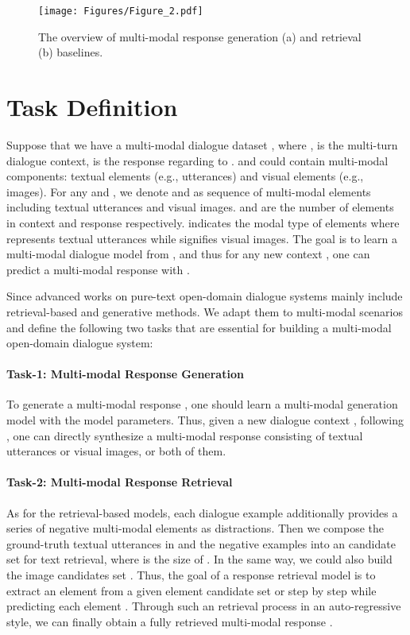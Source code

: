 \documentclass[11pt]{article}
\begin{document}
%
 \begin{figure*}[bht]
\centering
     \texttt{[image: Figures/Figure\_2.pdf]}
     \caption{The overview of multi-modal response generation (a) and retrieval (b) baselines.}
     \label{fig:model}
     \vspace{-5mm}
\end{figure*}



\section{Task Definition}
Suppose that we have a multi-modal dialogue dataset , where ,  is the multi-turn dialogue context,  is the response regarding to .  and  could contain multi-modal components: textual elements (e.g., utterances) and visual elements (e.g., images). For any  and , we denote  and  as sequence of multi-modal elements including textual utterances and visual images.  and  are the number of elements in context and response respectively.  indicates the modal type of elements where  represents textual utterances while  signifies visual images. The goal is to learn a multi-modal dialogue model  from , and thus for any new context , one can predict a multi-modal response  with . 

Since advanced works on pure-text open-domain dialogue systems mainly include retrieval-based  and generative methods. We adapt them to multi-modal scenarios and define the following two tasks that are essential for building a multi-modal open-domain dialogue system:

\paragraph{Task-1: Multi-modal Response Generation}
To generate a multi-modal response , one should learn a multi-modal generation model  with  the model parameters. Thus, given a new dialogue context ,  following , one can directly synthesize a multi-modal response  consisting of textual utterances or visual images, or both of them.


\paragraph{Task-2: Multi-modal Response Retrieval}
As for the retrieval-based models, each dialogue example  additionally provides a series of negative multi-modal elements as distractions. Then we compose the ground-truth textual utterances  in  and the negative examples into an candidate set  for text retrieval, where  is the size of . In the same way, we could also build the image candidates set . Thus, the goal of a response retrieval model is to extract an element from a given element candidate set  or  step by step while predicting each element . Through such an  retrieval process in an auto-regressive style, we can finally obtain a fully retrieved multi-modal response .
\end{document}

